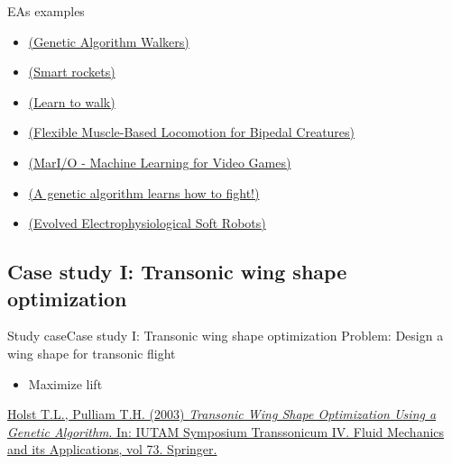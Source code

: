 \documentclass[10pt,compress]{beamer} %
\begin{document}
\begin{frame}{EAs examples}
	\begin{itemize}
		\item \href{http://rednuht.org/genetic\_walkers/} {(Genetic Algorithm Walkers)}
		\item \href{http://www.blprnt.com/smartrockets/}{(Smart rockets)}
		\item \href{https://www.youtube.com/watch?v=xcIBoPuNIiw}{(Learn to walk)}
		\item \href{https://www.youtube.com/watch?v=pgaEE27nsQw}{(Flexible Muscle-Based Locomotion for Bipedal Creatures)}
		\item \href{https://www.youtube.com/watch?v=qv6UVOQ0F44}{(MarI/O - Machine Learning for Video Games)}
		\item \href{https://www.youtube.com/watch?v=u2t77mQmJiY}{(A genetic algorithm learns how to fight!)}
		\item \href{https://www.youtube.com/watch?v=HgWQ-gPIvt4}{(Evolved Electrophysiological Soft Robots)}
	\end{itemize}
\end{frame}

\subsection{Case study I: Transonic wing shape optimization}
\begin{frame}{Study case}{Case study I: Transonic wing shape optimization}
    Problem: Design a wing shape for transonic flight
        \begin{itemize}
        \item Maximize lift
        \end{itemize}

    \setlength{\fboxrule}{0pt}
    \centering {} 
    
    \small
    \begin{flushleft}
    \href{https://link.springer.com/chapter/10.1007/978-94-010-0017-8\_38\#citeas}{Holst T.L., Pulliam T.H. (2003) \textit{Transonic Wing Shape Optimization Using a Genetic Algorithm}. In: IUTAM Symposium Transsonicum IV. Fluid Mechanics and its Applications, vol 73. Springer.}
    \end{flushleft}
\end{frame}
\end{document}
